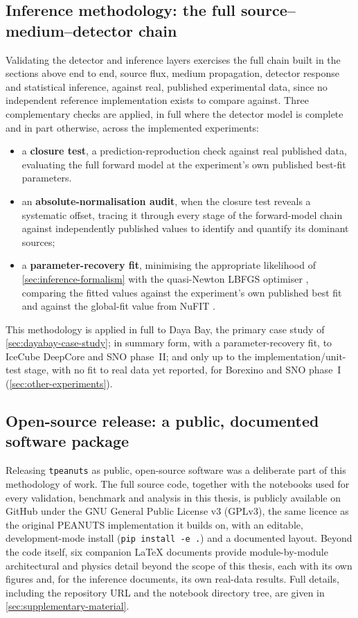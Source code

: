 \subsection{Inference methodology: the full source--medium--detector chain}
\label{sec:detector-validation-methodology}

Validating the detector and inference layers exercises the full chain built in the sections above end to end, source flux, medium propagation, detector response and statistical inference, against real, published experimental data, since no independent reference implementation exists to compare against. Three complementary checks are applied, in full where the detector model is complete and in part otherwise, across the implemented experiments:

\begin{itemize}
  \item a \textbf{closure test}, a prediction-reproduction check against real published data, evaluating the full forward model at the experiment's own published best-fit parameters.
  \item an \textbf{absolute-normalisation audit}, when the closure test reveals a systematic offset, tracing it through every stage of the forward-model chain against independently published values to identify and quantify its dominant sources;
  \item a \textbf{parameter-recovery fit}, minimising the appropriate likelihood of \cref{sec:inference-formalism} with the quasi-Newton LBFGS optimiser \parencite{LiuNocedal1989}, comparing the fitted values against the experiment's own published best fit and against the global-fit value from NuFIT \parencite{EstebanNuFit2024}.
\end{itemize}

This methodology is applied in full to Daya Bay, the primary case study of \cref{sec:dayabay-case-study}; in summary form, with a parameter-recovery fit, to IceCube DeepCore and SNO phase~II; and only up to the implementation/unit-test stage, with no fit to real data yet reported, for Borexino and SNO phase~I (\cref{sec:other-experiments}).

\subsection{Open-source release: a public, documented software package}
\label{sec:opensource-release}

Releasing \texttt{tpeanuts} as public, open-source software was a deliberate part of this methodology of work. The full source code, together with the notebooks used for every validation, benchmark and analysis in this thesis, is publicly available on GitHub under the GNU General Public License v3 (GPLv3), the same licence as the original PEANUTS implementation it builds on, with an editable, development-mode install (\texttt{pip install -e .}) and a documented layout. Beyond the code itself, six companion \LaTeX{} documents provide module-by-module architectural and physics detail beyond the scope of this thesis, each with its own figures and, for the inference documents, its own real-data results. Full details, including the repository URL and the notebook directory tree, are given in \cref{sec:supplementary-material}.
